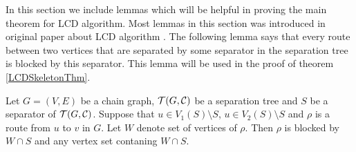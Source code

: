%
%
%
%

In this section we include lemmas which will be helpful in proving the main theorem for LCD algorithm.
Most lemmas in this section was introduced in original paper about LCD algorithm \cite{CG}.
The following lemma says that every route between two vertices that are separated by some separator in the separation tree
is blocked by this separator. This lemma will be used in the proof of theorem \ref{LCDSkeletonThm}. 

\begin{lemma} \label{lemma9}
	Let $G = (V, E)$ be a chain graph, $\mathcal{T}(G, \mathcal{C})$ be a separation tree and $S$ be a separator of $\mathcal{T}(G, \mathcal{C})$.
	Suppose that $u \in V_1(S) \setminus S$, $u \in V_2(S) \setminus S$ and $\rho$ is a route from $u$ to $v$ in $G$. Let $W$ denote
	set of vertices of $\rho$. Then $\rho$ is blocked by $W \cap S$ and any vertex set contaning $W \cap S$.
\end{lemma}

